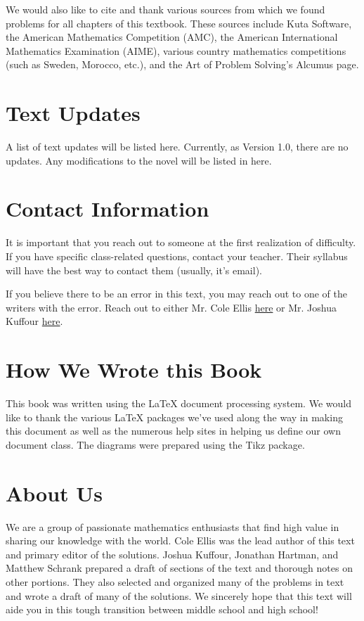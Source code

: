 \documentclass[../book.tex]{subfiles}
\begin{document}
We would also like to cite and thank various sources from which we found problems for all chapters of this textbook.  These sources include Kuta Software, the American Mathematics Competition (AMC), the American International Mathematics Examination (AIME), various country mathematics competitions (such as Sweden, Morocco, etc.), and the Art of Problem Solving's Alcumus page.

\section{Text Updates}
A list of text updates will be listed here.  Currently, as Version 1.0, there are no updates.  Any modifications to the novel will be listed in here.

\section{Contact Information}
It is important that you reach out to someone at the first realization of difficulty.  If you have specific class-related questions, contact your teacher.  Their syllabus will have the best way to contact them (usually, it's email).

If you believe there to be an error in this text, you may reach out to one of the writers with the error.  Reach out to either Mr.  Cole Ellis \href{mailto:educationelite1@gmail.com}{here} or Mr.  Joshua Kuffour \href{mailto:jkuffour1.jk@gmail.com}{here}.

\section{How We Wrote this Book}
This book was written using the \LaTeX{} document processing system.  We would like to thank the various \LaTeX{} packages we've used along the way in making this document as well as the numerous help sites in helping us define our own document class.  The diagrams were prepared using the Tikz package.

\section{About Us}
We are a group of passionate mathematics enthusiasts that find high value in sharing our knowledge with the world.  Cole Ellis was the lead author of this text and primary editor of the solutions.  Joshua Kuffour, Jonathan Hartman, and Matthew Schrank prepared a draft of sections of the text and thorough notes on other portions.  They also selected and organized many of the problems in text and wrote a draft of many of the solutions.  We sincerely hope that this text will aide you in this tough transition between middle school and high school!
\end{document}
